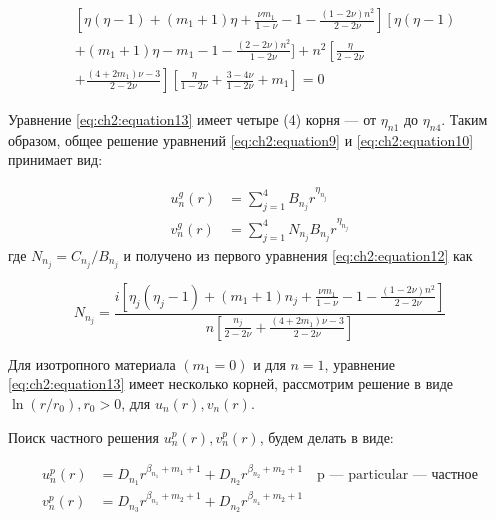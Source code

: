 \begin{equation}
\label{eq:ch2:equation13}
\begin{split}
	& \left [\eta  \left (\eta -1 \right )+  \left ( m_1 +1 \right ) \eta + \frac{\nu m_1}{1-\nu} -1 - \frac{ \left (1 - 2\nu  \right  ) n^2}{2-2\nu} \right ]  \left [ \eta  \left (\eta -1 \right ) \right. \\
	&+ \left. \left  ( m_1 + 1 \right ) \eta - m_1 - 1 - \frac{ \left ( 2-2\nu  \right ) n^2}{1-2\nu}  \right. ] +n^2 \left [ \frac{\eta}{2-2\nu}  \right. \\
	&+  \left. \frac{  \left ( 4+2 m_1 \right ) \nu -3}{2-2\nu}  \right ] \left  [ \frac{\eta}{1-2\nu} + \frac{3-4\nu}{1-2\nu} +m_1 \right ] = 0
\end{split}
\end{equation}

Уравнение \cref{eq:ch2:equation13} имеет четыре (4) корня --- от \( \eta_{n1} \) до \( \eta_{n4} \). Таким образом, общее решение уравнений \cref{eq:ch2:equation9} и \cref{eq:ch2:equation10} принимает вид:

\begin{equation}
\label{eq:ch2:equation14}
\begin{split}
	u_n^g(r) &= \sum_{j=1}^4 B_{n_j} r^{\eta_{n_j}}\\
	v_n^g(r) &= \sum_{j=1}^4 N_{n_j} B_{n_j} r^{\eta_{n_j}}
\end{split}
\end{equation}
где \( N_{n_j} = C_{n_j} / B_{n_j}\) и получено из первого уравнения \cref{eq:ch2:equation12} как

\begin{equation}
\label{eq:ch2:equation15}
	N_{n_j} = \frac{i \left [ \eta_j \left (\eta_j -1 \right ) + \left ( m_1 +1 \right ) n_j +\frac{\nu m_1}{1-\nu} -1 - \frac{\left (1-2\nu \right ) n^2}{2-2\nu} \right ]}{n \left [ \frac{n_j}{2-2\nu} + \frac{\left (4+2m_1 \right )\nu -3}{2-2\nu} \right ]}
\end{equation}

Для изотропного материала \((m_1=0) \) и для \(n=1\), уравнение \cref{eq:ch2:equation13} имеет несколько корней, рассмотрим решение в виде \( \ln{(r/r_0)},  r_0 > 0\), для \(u_n(r), v_n(r) \).

Поиск частного решения \(u_n^p(r), v_n^p(r) \), будем делать в виде:

\begin{equation}
\label{eq:ch2:equation16}
\begin{split}
	u_n^p(r) &= D_{n_1} r^{\beta_{n_1} + m_1 + 1} + D_{n_2} r^{\beta_{n_2} +m_2 + 1} \quad \text{p --- particular --- частное}\\
	v_n^p(r) &= D_{n_3} r^{\beta_{n_1} + m_2 + 1} + D_{n_2} r^{\beta_{n_4} +m_2 + 1}
\end{split}
\end{equation}

